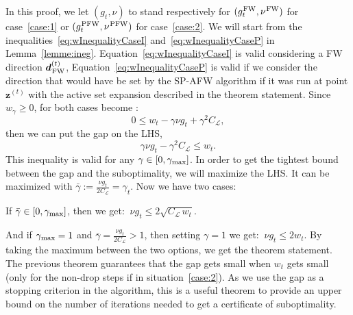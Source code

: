 \documentclass[twoside]{article}
\renewcommand{\L}{\mathcal{L}}
\newcommand{\zt}{\bm{z}^{(t)}}
\newcommand{\dt}{\bm{d}^{(t)}}
\newcommand{\wt}{w_t}
\newcommand{\gap}{g_{t}}
\newcommand{\CondNumb}{\nu}
\newcommand{\stepsize}{\gamma}
\newcommand{\stepmax}{\stepsize_{\textnormal{\scriptsize max}}} %
\newcommand{\FW}{{\hspace{0.05em}\textnormal{FW}}}
\newcommand{\PW}{{\hspace{0.05em}\textnormal{PFW}}}
\newcommand{\0}{\mathbf{0}} %
\begin{document}
  \proof In this proof, we let $(\gap, \CondNumb)$ to stand respectively for $(\gap^{\FW},\CondNumb^{\FW})$ for case~\eqref{case:1} or $(\gap^{\PW},\CondNumb^{\PW})$ for case~\eqref{case:2}.
    We will start from the inequalities~\eqref{eq:wInequalityCaseI} and~\eqref{eq:wInequalityCaseP} in Lemma~\ref{lemme:ineg}. Equation~\eqref{eq:wInequalityCaseI} is valid considering a FW direction $\dt_\FW$, Equation~\eqref{eq:wInequalityCaseP} is valid if we consider the direction that would have be set by the SP-AFW algorithm if it was run at point $\zt$ with the active set expansion described in the theorem statement.
    Since $w_\gamma \geq 0$,  for both cases become :
    \begin{equation}
     0 \leq \wt - \gamma \CondNumb\gap+ \gamma^2 C_\L,
    \end{equation}
    then we can put the gap on the LHS,
    \begin{equation} \label{eq:int_subopt_gap}
    \stepsize\CondNumb\gap - \stepsize^2 C_\L \leq \wt.
    \end{equation}
    This inequality is valid for any $\stepsize \in [0,\stepmax]$.
    In order to get the tightest bound between the gap and the suboptimality, we will maximize the LHS. It can be maximized with $\bar{\gamma} := \frac{\CondNumb\gap}{2C_\L}= \stepsize_t$.
    Now we have two cases: 

    If $\bar{\gamma} \in [0,\stepmax]$, then we get: $\: \CondNumb\gap \leq 2\sqrt{C_\L \, w_t}.$

    And if $\stepmax = 1$ and $\bar{\gamma} = \frac{\CondNumb\gap}{2C_\L} > 1$, then setting $\stepsize=1$ we get: $\: \CondNumb\gap \leq 2 w_t$. By taking the maximum between the two options, we get the theorem statement.
  \endproof
  The previous theorem guarantees that the gap gets small when $w_t$ gets small (only for the non-drop steps if in situation~\eqref{case:2}).
  As we use the gap as a stopping criterion in the algorithm, this is a useful theorem to provide an upper bound on the number of iterations needed to get a certificate of suboptimality.
  
\end{document}
